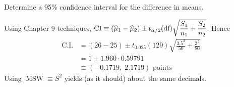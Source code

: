Determine a 95\% confidence interval for the difference in means.

\soln* Using Chapter 9 techniques, $\displaystyle \text{CI} \equiv (\widehat{\mu}_1 - \widehat{\mu}_2) \pm t_{\alpha/2}(\text{df})\sqrt{\frac{S_1}{n_1} + \frac{S_2}{n_2}}$. Hence
\begin{align*}
    \text{C.I.} &= (26 - 25) \pm t_{0.025}(129) \sqrt{ \frac{3.5^2}{50} + \frac{3^2}{80}}\\
    &= 1 \pm 1.960 \cdot 0.59791\\
    &\equiv (-0.1719, \; 2.1719) \text{ points}
\end{align*}
Using $\operatorname{MSW} \equiv S^2$ yields (as it should) about the same decimals. 